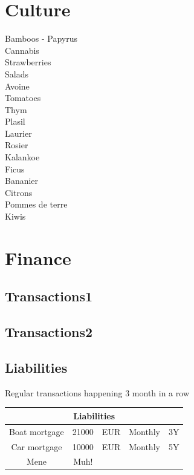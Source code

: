\documentclass[8pt]{article} %
\begin{document}
\section{Culture}
Bamboos - Papyrus			\\
Cannabis			\\
Strawberries			\\
Salads			\\
Avoine			\\
Tomatoes			\\
Thym			\\
Plasil			\\
Laurier			\\
Rosier			\\
Kalankoe			\\
Ficus			\\
Bananier			\\
Citrons			\\
Pommes de terre			\\
Kiwis			\\

\section{Finance}

\subsection{Transactions1}
{\footnotesize

}
\subsection{Transactions2}
{\footnotesize

}

\subsection{Liabilities}

Regular transactions happening 3 month in a row\\
\begin{tabular}{|c|c|c|c|c|}
\hline
\multicolumn{5}{|c|}{Liabilities} \\
\hline
Boat mortgage & 21000 & EUR & Monthly & 3Y \\
\hline
Car mortgage & 10000 & EUR & Monthly & 5Y \\
\hline
Mene & Muh! & & &\\
\hline
\end{tabular}
\end{document}

